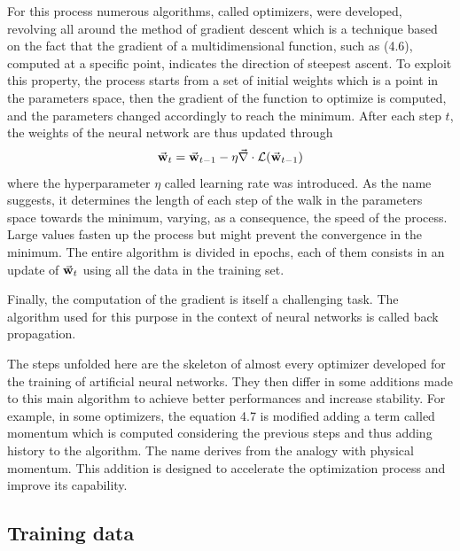 \documentclass[a4paper,10pt]{report}
\begin{document}
For this process numerous algorithms, called optimizers, were developed, 
revolving all around the method of gradient descent
which is a technique based on the fact that the gradient of a multidimensional function, such as (4.6), computed
at a specific point, indicates the direction of steepest ascent.
To exploit this property, the process starts from a set of initial weights which is a point in the parameters space, 
then the gradient of the function to optimize is computed, and the parameters changed accordingly to reach the minimum.
After each step $t$, the weights of the neural network are thus updated through
\begin{equation}
    \va w_t = \va w_{t-1} - \eta \va \nabla \cdot \mathcal{L}(\va w_{t-1})
\end{equation}
where the hyperparameter $\eta$ called learning rate was introduced. As the name suggests, it determines 
the length of each step of the walk in the parameters space towards the minimum, varying, as a consequence,
the speed of the process. Large values fasten up the process but might prevent the convergence
in the minimum. The entire algorithm is divided in epochs, each of them consists in an update of $\va w_t$
using all the data in the training set.

Finally, the computation of the gradient is itself a challenging task. The algorithm used for this purpose in the context 
of neural networks is called back propagation.

The steps unfolded here are the skeleton of almost every optimizer developed for the training of artificial neural 
networks. They then differ in some additions
made to this main algorithm to achieve better performances and increase stability.
For example, in some optimizers, the equation 4.7 is modified adding a term called momentum which is computed 
considering the previous steps and thus adding history to the algorithm. The name derives from the analogy with physical momentum.
This addition is designed to accelerate the optimization process and improve its capability.

\subsection{Training data}

\end{document}
